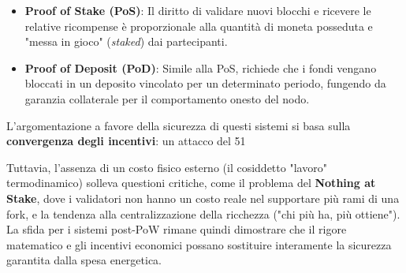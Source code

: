 \begin{itemize}
    \item \textbf{Proof of Stake (PoS)}: Il diritto di validare nuovi blocchi e ricevere le relative ricompense è proporzionale alla quantità di moneta posseduta e "messa in gioco" (\textit{staked}) dai partecipanti.
    \item \textbf{Proof of Deposit (PoD)}: Simile alla PoS, richiede che i fondi vengano bloccati in un deposito vincolato per un determinato periodo, fungendo da garanzia collaterale per il comportamento onesto del nodo.
\end{itemize}

L'argomentazione a favore della sicurezza di questi sistemi si basa sulla \textbf{convergenza degli incentivi}: un attacco del 51%

Tuttavia, l'assenza di un costo fisico esterno (il cosiddetto "lavoro" termodinamico) solleva questioni critiche, come il problema del \textbf{Nothing at Stake}, dove i validatori non hanno un costo reale nel supportare più rami di una fork, e la tendenza alla centralizzazione della ricchezza ("chi più ha, più ottiene"). La sfida per i sistemi post-PoW rimane quindi dimostrare che il rigore matematico e gli incentivi economici possano sostituire interamente la sicurezza garantita dalla spesa energetica.